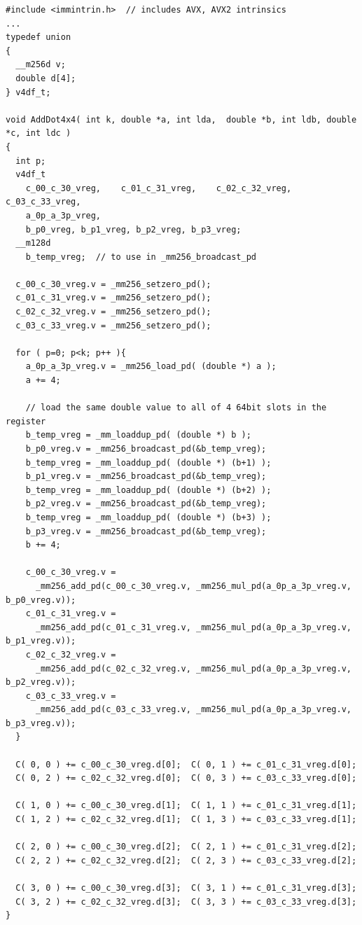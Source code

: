 \documentclass{article}
\begin{document}
\begin{verbatim}
#include <immintrin.h>  // includes AVX, AVX2 intrinsics
...
typedef union
{
  __m256d v;
  double d[4];
} v4df_t;

void AddDot4x4( int k, double *a, int lda,  double *b, int ldb, double *c, int ldc )
{
  int p;
  v4df_t
    c_00_c_30_vreg,    c_01_c_31_vreg,    c_02_c_32_vreg,    c_03_c_33_vreg,
    a_0p_a_3p_vreg,
    b_p0_vreg, b_p1_vreg, b_p2_vreg, b_p3_vreg; 
  __m128d 
    b_temp_vreg;  // to use in _mm256_broadcast_pd

  c_00_c_30_vreg.v = _mm256_setzero_pd();   
  c_01_c_31_vreg.v = _mm256_setzero_pd();
  c_02_c_32_vreg.v = _mm256_setzero_pd(); 
  c_03_c_33_vreg.v = _mm256_setzero_pd(); 

  for ( p=0; p<k; p++ ){
    a_0p_a_3p_vreg.v = _mm256_load_pd( (double *) a );
    a += 4;

    // load the same double value to all of 4 64bit slots in the register
    b_temp_vreg = _mm_loaddup_pd( (double *) b );
    b_p0_vreg.v = _mm256_broadcast_pd(&b_temp_vreg);
    b_temp_vreg = _mm_loaddup_pd( (double *) (b+1) );
    b_p1_vreg.v = _mm256_broadcast_pd(&b_temp_vreg);
    b_temp_vreg = _mm_loaddup_pd( (double *) (b+2) );
    b_p2_vreg.v = _mm256_broadcast_pd(&b_temp_vreg);
    b_temp_vreg = _mm_loaddup_pd( (double *) (b+3) );
    b_p3_vreg.v = _mm256_broadcast_pd(&b_temp_vreg);
    b += 4;

    c_00_c_30_vreg.v = 
      _mm256_add_pd(c_00_c_30_vreg.v, _mm256_mul_pd(a_0p_a_3p_vreg.v, b_p0_vreg.v));
    c_01_c_31_vreg.v = 
      _mm256_add_pd(c_01_c_31_vreg.v, _mm256_mul_pd(a_0p_a_3p_vreg.v, b_p1_vreg.v));
    c_02_c_32_vreg.v = 
      _mm256_add_pd(c_02_c_32_vreg.v, _mm256_mul_pd(a_0p_a_3p_vreg.v, b_p2_vreg.v));
    c_03_c_33_vreg.v = 
      _mm256_add_pd(c_03_c_33_vreg.v, _mm256_mul_pd(a_0p_a_3p_vreg.v, b_p3_vreg.v));
  }

  C( 0, 0 ) += c_00_c_30_vreg.d[0];  C( 0, 1 ) += c_01_c_31_vreg.d[0];  
  C( 0, 2 ) += c_02_c_32_vreg.d[0];  C( 0, 3 ) += c_03_c_33_vreg.d[0]; 

  C( 1, 0 ) += c_00_c_30_vreg.d[1];  C( 1, 1 ) += c_01_c_31_vreg.d[1];  
  C( 1, 2 ) += c_02_c_32_vreg.d[1];  C( 1, 3 ) += c_03_c_33_vreg.d[1]; 

  C( 2, 0 ) += c_00_c_30_vreg.d[2];  C( 2, 1 ) += c_01_c_31_vreg.d[2];  
  C( 2, 2 ) += c_02_c_32_vreg.d[2];  C( 2, 3 ) += c_03_c_33_vreg.d[2]; 

  C( 3, 0 ) += c_00_c_30_vreg.d[3];  C( 3, 1 ) += c_01_c_31_vreg.d[3];  
  C( 3, 2 ) += c_02_c_32_vreg.d[3];  C( 3, 3 ) += c_03_c_33_vreg.d[3]; 
}
\end{verbatim}
\end{document}
